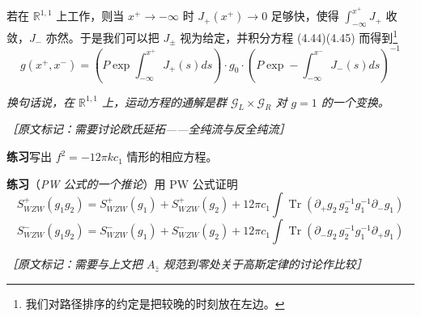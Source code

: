 若在 $\mathbb{R}^{1,1}$ 上工作，则当 $x^+\to-\infty$ 时 $J_+(x^+)\to 0$ 足够快，使得 $\int^{x^+}_{-\infty}J_+$ 收敛，$J_-$ 亦然。于是我们可以把 $J_\pm$ 视为给定，并积分方程 (4.44)(4.45) 而得到\footnote{我们对路径排序的约定是把较晚的时刻放在左边。}
\begin{equation}
  g(x^+,x^-) = \left(P\exp\int^{x^+}_{-\infty}J_+(s)ds\right)\cdot g_0\cdot\left(P\exp -\int^{x^-}_{-\infty}J_-(s)ds\right)^{-1}
  \tag{4.47}
  \label{eq:4.47}
\end{equation}

\emph{换句话说，在 $\mathbb{R}^{1,1}$ 上，运动方程的通解是群 $\mathcal{G}_L\times\mathcal{G}_R$ 对 $g=1$ 的一个变换。}


{\small\itshape ［原文标记：需要讨论欧氏延拓——全纯流与反全纯流］}

\medskip
\noindent\textbf{练习}\quad 写出 $f^2=-12\pi k c_1$ 情形的相应方程。

\medskip
\noindent\textbf{练习}（\emph{PW 公式的一个推论}）\quad 用 PW 公式证明
\begin{equation}
  S^+_{WZW}(g_1g_2) = S^+_{WZW}(g_1) + S^+_{WZW}(g_2) + 12\pi c_1\int\operatorname{Tr}\left(\partial_+ g_2\,g_2^{-1}g_1^{-1}\partial_- g_1\right)
  \tag{4.48}
  \label{eq:4.48}
\end{equation}
\begin{equation}
  S^-_{WZW}(g_1g_2) = S^-_{WZW}(g_1) + S^-_{WZW}(g_2) + 12\pi c_1\int\operatorname{Tr}\left(\partial_- g_2\,g_2^{-1}g_1^{-1}\partial_+ g_1\right)
  \tag{4.49}
  \label{eq:4.49}
\end{equation}

{\small\itshape ［原文标记：需要与上文把 $A_{\bar z}$ 规范到零处关于高斯定律的讨论作比较］}

